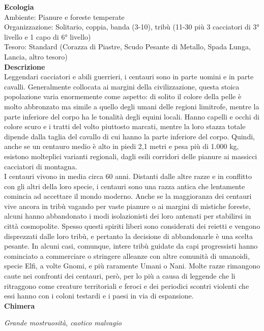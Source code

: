 \begin{multicols}{2}
\textbf{Ecologia}\\
Ambiente: Pianure e foreste temperate\\
Organizzazione: Solitario, coppia, banda (3-10), tribù (11-30 più 3 cacciatori di 3° livello e 1 capo di 6° livello)\\
Tesoro: Standard (Corazza di Piastre, Scudo Pesante di Metallo, Spada Lunga, Lancia, altro tesoro)\\
\textbf{Descrizione}\\
Leggendari cacciatori e abili guerrieri, i centauri sono in parte uomini e in parte cavalli. Generalmente collocata ai margini della civilizzazione, questa stoica popolazione varia enormemente come aspetto: di solito il colore della pelle è molto abbronzato ma simile a quello degli umani delle regioni limitrofe, mentre la parte inferiore del corpo ha le tonalità degli equini locali. Hanno capelli e occhi di colore scuro e i tratti del volto piuttosto marcati, mentre la loro stazza totale dipende dalla taglia del cavallo di cui hanno la parte inferiore del corpo. Quindi, anche se un centauro medio è alto in piedi 2,1 metri e pesa più di 1.000 kg, esistono molteplici varianti regionali, dagli esili corridori delle pianure ai massicci cacciatori di montagna.\\
I centauri vivono in media circa 60 anni. Distanti dalle altre razze e in conflitto con gli altri della loro specie, i centauri sono una razza antica che lentamente comincia ad accettare il mondo moderno. Anche se la maggioranza dei centauri vive ancora in tribù vagando per vaste pianure o ai margini di mistiche foreste, alcuni hanno abbandonato i modi isolazionisti dei loro antenati per stabilirsi in città cosmopolite. Spesso questi spiriti liberi sono considerati dei reietti e vengono disprezzati dalle loro tribù, e pertanto la decisione di abbandonarle è una scelta pesante. In alcuni casi, comunque, intere tribù guidate da capi progressisti hanno cominciato a commerciare o stringere alleanze con altre comunità di umanoidi, specie Elfi, a volte Gnomi, e più raramente Umani o Nani. Molte razze rimangono caute nei confronti dei centauri, però, per lo più a causa di leggende che li ritraggono come creature territoriali e feroci e dei periodici scontri violenti che essi hanno con i coloni testardi e i paesi in via di espansione.\\


\medskip{}\textbf{Chimera}

\emph{Grande mostruosità, caotico malvagio}


\end{multicols}

